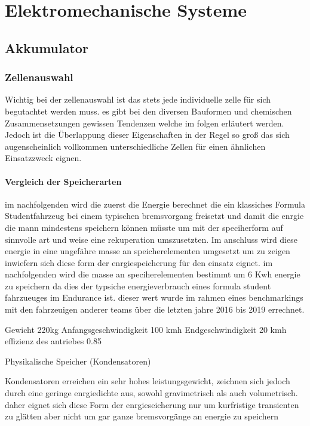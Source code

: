 
\chapter{Elektromechanische Systeme}

\section{Akkumulator}

\subsection{Zellenauswahl}

Wichtig bei der zellenauswahl ist das stets jede individuelle zelle für sich begutachtet werden muss. es gibt bei den diversen Bauformen und chemischen Zusammensetzungen gewissen Tendenzen welche im folgen erläutert werden. Jedoch ist die Überlappung dieser Eigenschaften in der Regel so groß das sich augenscheinlich vollkommen unterschiedliche Zellen für einen ähnlichen Einsatzzweck eignen.

\subsubsection{Vergleich der Speicherarten}

im nachfolgenden wird die zuerst die Energie berechnet die ein klassiches Formula Studentfahrzeug bei einem typischen bremsvorgang freisetzt und damit die enrgie die mann mindestens speichern können müsste um mit der speciherform auf sinnvolle art und weise eine rekuperation umszusetzten. Im anschluss wird diese energie in eine ungefähre masse an speicherelementen umgesetzt um zu zeigen inwiefern sich diese form der enrgiespeicherung für den einsatz eignet. im nachfolgenden wird die masse an speciherelementen bestimmt um 6 Kwh energie zu speichern da dies der typsiche energieverbrauch eines formula student fahrzueuges im Endurance ist. dieser wert wurde im rahmen eines benchmarkings mit den fahrzeuigen anderer teams über die letzten jahre 2016 bis 2019 errechnet.

Gewicht 220kg
Anfangsgeschwindigkeit 100 kmh
Endgeschwindigkeit 20 kmh
effizienz des antriebes 0.85


Physikalische Speicher (Kondensatoren)

	Kondensatoren erreichen ein sehr hohes leistungsgewicht, zeichnen sich jedoch durch eine geringe enrgiedichte aus, sowohl gravimetrisch als auch volumetrisch. daher eignet sich diese Form der enrgieseicherung nur um kurfristige transienten zu glätten aber nicht um gar ganze bremsvorgänge an energie zu speichern

